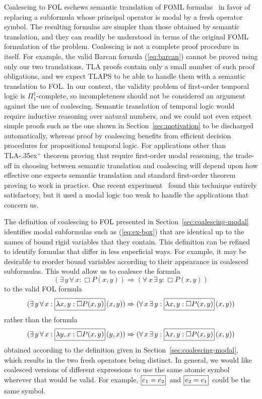 \documentclass{easychair}
\renewcommand{\implies}{\Rightarrow}
\newcommand{\tlaplus}{\mbox{TLA\kern -.35ex$^+$}\xspace}
\newcommand{\B}[1]{\framebox{\rule{0pt}{.6em}\ensuremath{\!\tlachars #1\!}}\,}
\let\tlachars\relax
\def\A{\forall\,}
\def\E{\exists\,}
\newcommand{\TRUE}{\mbox{\sc true}}
\begin{document}
Coalescing to FOL eschews semantic translation of FOML
formulas~\cite{ohlbach:translation} in favor of replacing a subformula whose
principal operator is modal by a fresh operator symbol.
The resulting formulas
are simpler than those obtained by semantic translation, and they can readily be
understood in terms of the original FOML formulation of the problem. Coalescing
is not a complete proof procedure in itself. For example, the valid Barcan
formula (\ref{eq:barcan})
cannot be proved using only our two translations.  TLA proofs contain
only a small number of such proof obligations, and we expect TLAPS to
be able to handle them with a semantic translation to FOL\@.
In our context, the validity problem of first-order temporal logic is
$\Pi_1^1$-complete, so incompleteness should not be considered an
argument against the use of coalescing. Semantic translation of temporal logic
would require inductive reasoning over natural numbers, and we could not even
expect simple proofs such as the one shown in Section~\ref{sec:motivation} to be
discharged automatically, whereas proof by coalescing benefits from efficient
decision procedures for propositional temporal logic.
For applications other than \tlaplus theorem proving that require
first-order modal reasoning, the trade-off in choosing between semantic
translation and coalescing will depend upon how effective one expects
semantic translation and standard first-order theorem proving to work
in practice.  One recent experiment~\cite{benzmueller:god} found this
technique entirely satisfactory, but it used a modal logic too weak to
handle the applications that concern us.

The definition of coalescing to FOL presented in
Section~\ref{sec:coalescing-modal} identifies modal subformulas such as
(\ref{eq:ex-box}) that are identical up to the names of bound rigid variables
that they contain. This definition can be refined to identify formulas that
differ in less superficial ways.
For example, it may be desirable to reorder bound variables according to their
appearance in coalesced subformulas. This would allow us to coalesce the formula
\[
  (\E y\, \A x : \Box P(x,y)) \implies (\A x\, \E y : \Box P(x,y))
\]
to the valid FOL formula
\[
  (\E y\, \A x : \B{\lambda x,y : \Box P(x,y)}(x,y)) \implies
  (\A x\, \E y : \B{\lambda x,y : \Box P(x,y)}(x,y))
\]
rather than the formula
\[
  (\E y\, \A x : \B{\lambda y,x : \Box P(x,y)}(y,x)) \implies
  (\A x\, \E y : \B{\lambda x,y : \Box P(x,y)}(x,y))
\] obtained according to the definition given in
Section~\ref{sec:coalescing-modal}, which results in the two fresh
operators being distinct.  In general, we would like coalesced
versions of different expressions to use the same atomic symbol
wherever that would be valid.  For example,
$\B{e_{1}=e_{2}}$ and $\B{e_{2}=e_{1}}$ could be the same symbol.
%
%
\end{document}
